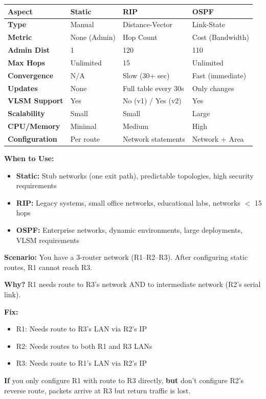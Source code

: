 \documentclass[12pt,a4paper]{article}
\begin{document}
\begin{abox}
\begin{center}
\begin{tabularx}{\textwidth}{lXXX}
\toprule
\textbf{Aspect} & \textbf{Static} & \textbf{RIP} & \textbf{OSPF} \\
\midrule
\textbf{Type} & Manual & Distance-Vector & Link-State \\
\textbf{Metric} & None (Admin) & Hop Count & Cost (Bandwidth) \\
\textbf{Admin Dist} & 1 & 120 & 110 \\
\textbf{Max Hops} & Unlimited & 15 & Unlimited \\
\textbf{Convergence} & N/A & Slow (30+ sec) & Fast (immediate) \\
\textbf{Updates} & None & Full table every 30s & Only changes \\
\textbf{VLSM Support} & Yes & No (v1) / Yes (v2) & Yes \\
\textbf{Scalability} & Small & Small & Large \\
\textbf{CPU/Memory} & Minimal & Medium & High \\
\textbf{Configuration} & Per route & Network statements & Network + Area \\
\bottomrule
\end{tabularx}
\end{center}

\textbf{When to Use:}

\begin{itemize}
    \item \textbf{Static:} Stub networks (one exit path), predictable topologies, high security requirements
    \item \textbf{RIP:} Legacy systems, small office networks, educational labs, networks $<$ 15 hops
    \item \textbf{OSPF:} Enterprise networks, dynamic environments, large deployments, VLSM requirements
\end{itemize}
\end{abox}


\begin{condbox}
\textbf{Scenario:} You have a 3-router network (R1--R2--R3). After configuring static routes, R1 cannot reach R3.

\textbf{Why?} R1 needs route to R3's network AND to intermediate network (R2's serial link).

\textbf{Fix:}
\begin{itemize}
    \item R1: Needs route to R3's LAN via R2's IP
    \item R2: Needs routes to both R1 and R3 LANs
    \item R3: Needs route to R1's LAN via R2's IP
\end{itemize}

\textbf{If} you only configure R1 with route to R3 directly, \textbf{but} don't configure R2's reverse route, packets arrive at R3 but return traffic is lost.
\end{condbox}
\end{document}
